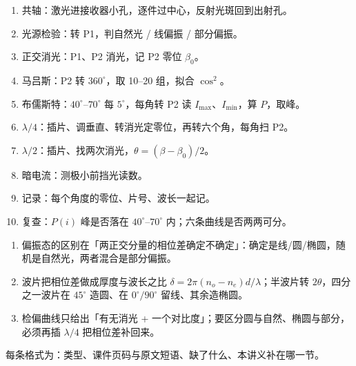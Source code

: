 \documentclass[11pt]{ctexart}
\begin{document}

\begin{enumerate}
\item 共轴：激光进接收器小孔，逐件过中心，反射光斑回到出射孔。
\item 光源检验：转 P1，判自然光 / 线偏振 / 部分偏振。
\item 正交消光：P1、P2 消光，记 P2 零位 $\beta_0$。
\item 马吕斯：P2 转 $360^\circ$，取 10--20 组，拟合 $\cos^2$。
\item 布儒斯特：$40^\circ$--$70^\circ$ 每 $5^\circ$，每角转 P2 读 $I_{\max}$、$I_{\min}$，算 $P$，取峰。
\item $\lambda/4$：插片、调垂直、转消光定零位，再转六个角，每角扫 P2。
\item $\lambda/2$：插片、找两次消光，$\theta=(\beta-\beta_0)/2$。
\item 暗电流：测极小前挡光读数。
\item 记录：每个角度的零位、片号、波长一起记。
\item 复查：$P(i)$ 峰是否落在 $40^\circ$--$70^\circ$ 内；六条曲线是否两两可分。
\end{enumerate}


\begin{enumerate}
\item 偏振态的区别在「两正交分量的相位差确定不确定」：确定是线/圆/椭圆，随机是自然光，两者混合是部分偏振。
\item 波片把相位差做成厚度与波长之比 $\delta=2\pi(n_o-n_e)d/\lambda$；半波片转 $2\theta$，四分之一波片在 $45^\circ$ 造圆、在 $0^\circ/90^\circ$ 留线、其余造椭圆。
\item 检偏曲线只给出「有无消光 + 一个对比度」；要区分圆与自然、椭圆与部分，必须再插 $\lambda/4$ 把相位差补回来。
\end{enumerate}


每条格式为：类型、课件页码与原文短语、缺了什么、本讲义补在哪一节。


\end{document}

